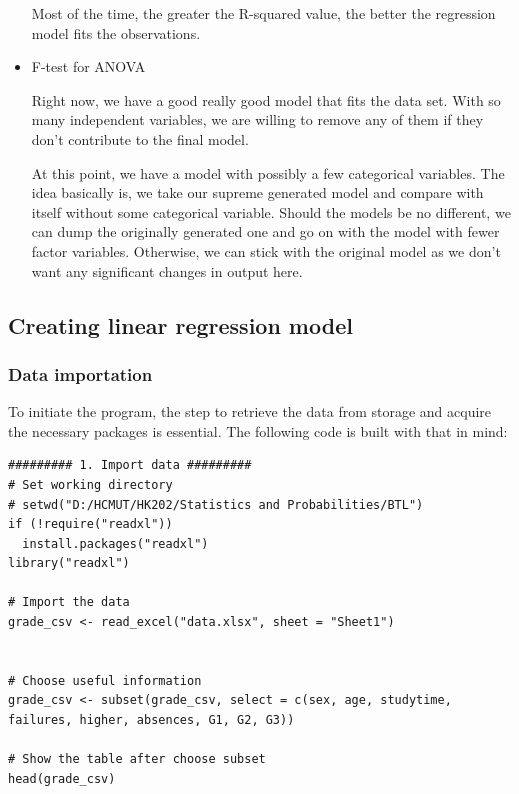 \documentclass[a4paper]{article}
\numberwithin{equation}{section}
\begin{document}
\begin{itemize}
        Most of the time, the greater the R-squared value, the better the regression model fits the observations.

  \item F-test for ANOVA

        Right now, we have a good really good model that fits the data set.
        With so many independent variables, we are willing to remove any of them if they don't contribute to the final model.

        At this point, we have a model with possibly a few categorical variables.
        The idea basically is, we take our supreme generated model and compare with itself without some categorical variable.
        Should the models be no different, we can dump the originally generated one and go on with the model with fewer factor variables.
        Otherwise, we can stick with the original model as we don't want any significant changes in output here.
\end{itemize}

\newpage
\subsection{Creating linear regression model}
\subsubsection{Data importation}
To initiate the program, the step to retrieve the data from storage and acquire the necessary packages is essential. The following code is built with that in mind:

\begin{mdframed}[leftline=false,rightline=false,backgroundcolor=magenta!10,nobreak=true]
  \begin{verbatim}
######### 1. Import data #########
# Set working directory
# setwd("D:/HCMUT/HK202/Statistics and Probabilities/BTL")
if (!require("readxl"))
  install.packages("readxl")
library("readxl")

# Import the data
grade_csv <- read_excel("data.xlsx", sheet = "Sheet1")


# Choose useful information
grade_csv <- subset(grade_csv, select = c(sex, age, studytime, failures, higher, absences, G1, G2, G3))

# Show the table after choose subset
head(grade_csv)
  \end{verbatim}
\end{mdframed}
\end{document}
